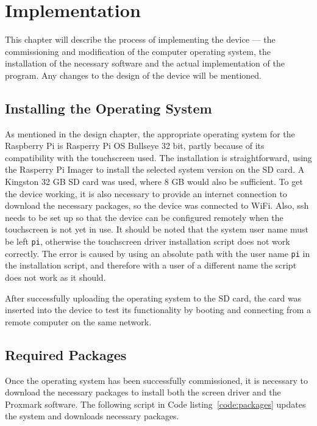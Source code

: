 \chapter{Implementation}

This chapter will describe the process of implementing the device --- the commissioning and modification of the computer operating system, the installation of the necessary software and the actual implementation of the program. Any changes to the design of the device will be mentioned.

\section{Installing the Operating System}

As mentioned in the design chapter, the appropriate operating system for the Raspberry Pi is Rasperry Pi OS Bullseye 32 bit, partly because of its compatibility with the touchscreen used. The installation is straightforward, using the Rasperry Pi Imager to install the selected system version on the SD card. A Kingston 32 GB SD card was used, where 8 GB would also be sufficient. To get the device working, it is also necessary to provide an internet connection to download the necessary packages, so the device was connected to WiFi. Also, ssh needs to be set up so that the device can be configured remotely when the touchscreen is not yet in use. It should be noted that the system user name must be left \texttt{pi}, otherwise the touchscreen driver installation script does not work correctly. The error is caused by using an absolute path with the user name \texttt{pi} in the installation script, and therefore with a user of a different name the script does not work as it should.   

After successfully uploading the operating system to the SD card, the card was inserted into the device to test its functionality by booting and connecting from a remote computer on the same network.  

\section{Required Packages}

Once the operating system has been successfully commissioned, it is necessary to download the necessary packages to install both the screen driver and the Proxmark software. The following script in Code listing~\ref{code:packages} updates the system and downloads necessary packages.

